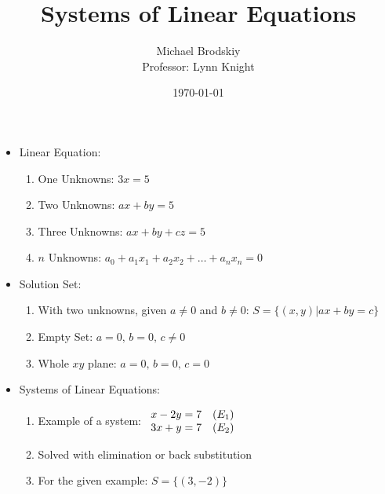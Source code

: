 \documentclass[12pt]{article}
\title{Systems of Linear Equations}
\date{\today}
\author{Michael Brodskiy\\ \small Professor: Lynn Knight}
\begin{document}
\maketitle

\begin{itemize}

  \item Linear Equation:

    \begin{enumerate}

      \item One Unknowns: $3x=5$

      \item Two Unknowns: $ax+by=5$

      \item Three Unknowns: $ax+by+cz=5$

      \item $n$ Unknowns: $a_0+a_1x_1+a_2x_2+\dots+a_nx_n=0$

    \end{enumerate}

  \item Solution Set:

    \begin{enumerate}

      \item With two unknowns, given $a\neq0$ and $b\neq0$: $S=\{(x,y)|ax+by=c\}$

      \item Empty Set: $a=0,\,b=0,\,c\neq0$

      \item Whole $xy$ plane: $a=0,\,b=0,\,c=0$

    \end{enumerate}

  \item Systems of Linear Equations:

    \begin{enumerate}

      \item Example of a system: $\begin{array}{l l} x-2y=7 & (E_1) \\ 3x+y=7 & (E_2) \end{array}$

      \item Solved with elimination or back substitution

      \item For the given example: $S=\{(3,-2)\}$


\end{enumerate}
\end{itemize}
\end{document}
